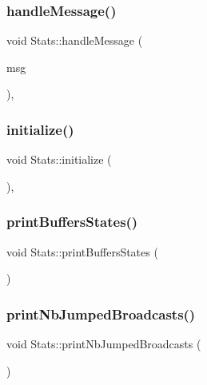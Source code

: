 \subsubsection{\texorpdfstring{handle\+Message()}{handleMessage()}}
{\footnotesize\ttfamily void Stats\+::handle\+Message (\begin{DoxyParamCaption}\item[{c\+Message $\ast$}]{msg }\end{DoxyParamCaption})\hspace{0.3cm}{\ttfamily [private]}, {\ttfamily [virtual]}}

\mbox{\label{class_stats_a650afe7cc5721ec17cfdc94475365f89}} 
\subsubsection{\texorpdfstring{initialize()}{initialize()}}
{\footnotesize\ttfamily void Stats\+::initialize (\begin{DoxyParamCaption}{ }\end{DoxyParamCaption})\hspace{0.3cm}{\ttfamily [private]}, {\ttfamily [virtual]}}

\mbox{\label{class_stats_a890d6dea5350042fd71313826b103583}} 
\subsubsection{\texorpdfstring{print\+Buffers\+States()}{printBuffersStates()}}
{\footnotesize\ttfamily void Stats\+::print\+Buffers\+States (\begin{DoxyParamCaption}{ }\end{DoxyParamCaption})\hspace{0.3cm}{\ttfamily [private]}}

\mbox{\label{class_stats_aaba10264a569b9240a300ddc341e6a8c}} 
\subsubsection{\texorpdfstring{print\+Nb\+Jumped\+Broadcasts()}{printNbJumpedBroadcasts()}}
{\footnotesize\ttfamily void Stats\+::print\+Nb\+Jumped\+Broadcasts (\begin{DoxyParamCaption}{ }\end{DoxyParamCaption})\hspace{0.3cm}{\ttfamily [private]}}

